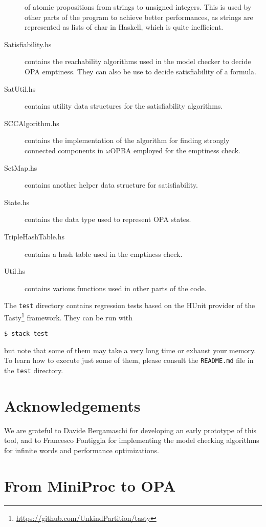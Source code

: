 \documentclass[9pt,a4paper]{article}
\begin{document}
\begin{description}
  of atomic propositions from strings to unsigned integers.
  This is used by other parts of the program to achieve better performances,
  as strings are represented as lists of char in Haskell, which is quite
  inefficient.
\item[Satisfiability.hs] contains the reachability algorithms used in the
  model checker to decide OPA emptiness. They can also be use to decide
  satisfiability of a formula.
\item[SatUtil.hs] contains utility data structures for the satisfiability algorithms.
\item[SCCAlgorithm.hs] contains the implementation of the algorithm for finding strongly
  connected components in $\omega$OPBA employed for the emptiness check.
\item[SetMap.hs] contains another helper data structure for satisfiability.
\item[State.hs] contains the data type used to represent OPA states.
\item[TripleHashTable.hs] contains a hash table used in the emptiness check.
\item[Util.hs] contains various functions used in other parts of the code.
\end{description}

The \texttt{test} directory contains regression tests based on the HUnit
provider of the Tasty\footnote{\url{https://github.com/UnkindPartition/tasty}} framework.
They can be run with
\begin{verbatim}
$ stack test
\end{verbatim}
but note that some of them may take a very long time or exhaust your memory.
To learn how to execute just some of them, please consult the \texttt{README.md}
file in the \texttt{test} directory.

\section*{Acknowledgements}

We are grateful to Davide Bergamaschi for developing an early prototype of this tool,
and to Francesco Pontiggia for implementing the model checking algorithms
for infinite words and performance optimizations.





\appendix

\section{From MiniProc to OPA}
\label{sec:miniproc-to-opa}
\end{document}
